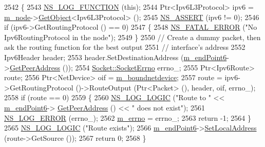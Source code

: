 \begin{DoxyCode}
2542 \{
2543   \hyperlink{log-macros-disabled_8h_a90b90d5bad1f39cb1b64923ea94c0761}{NS\_LOG\_FUNCTION} (\textcolor{keyword}{this});
2544   Ptr<Ipv6L3Protocol> ipv6 = \hyperlink{classns3_1_1TcpSocketBase_abefd2b9f439fe5d0deef93ee68884a1e}{m\_node}->\hyperlink{classns3_1_1Object_a13e18c00017096c8381eb651d5bd0783}{GetObject}<Ipv6L3Protocol> ();
2545   \hyperlink{assert_8h_a6dccdb0de9b252f60088ce281c49d052}{NS\_ASSERT} (ipv6 != 0);
2546   \textcolor{keywordflow}{if} (ipv6->GetRoutingProtocol () == 0)
2547     \{
2548       \hyperlink{group__fatal_ga5131d5e3f75d7d4cbfd706ac456fdc85}{NS\_FATAL\_ERROR} (\textcolor{stringliteral}{"No Ipv6RoutingProtocol in the node"});
2549     \}
2550   \textcolor{comment}{// Create a dummy packet, then ask the routing function for the best output}
2551   \textcolor{comment}{// interface's address}
2552   Ipv6Header header;
2553   header.SetDestinationAddress (\hyperlink{classns3_1_1TcpSocketBase_ab4b114c3959ee672b4fc9b7a90540dba}{m\_endPoint6}->\hyperlink{classns3_1_1Ipv6EndPoint_aa48c776ae54d85cf0f6a61a80d7b4cd8}{GetPeerAddress} ());
2554   \hyperlink{classns3_1_1Socket_ada1328c5ae0c28cb2a982caf8f6d6cca}{Socket::SocketErrno} errno\_;
2555   Ptr<Ipv6Route> route;
2556   Ptr<NetDevice> oif = \hyperlink{classns3_1_1Socket_a9781d8dfdb5e9364d5dce8f53b768bb5}{m\_boundnetdevice};
2557   route = ipv6->GetRoutingProtocol ()->RouteOutput (Ptr<Packet> (), header, oif, errno\_);
2558   \textcolor{keywordflow}{if} (route == 0)
2559     \{
2560       \hyperlink{group__logging_ga88acd260151caf2db9c0fc84997f45ce}{NS\_LOG\_LOGIC} (\textcolor{stringliteral}{"Route to "} << \hyperlink{classns3_1_1TcpSocketBase_ab4b114c3959ee672b4fc9b7a90540dba}{m\_endPoint6}->
      \hyperlink{classns3_1_1Ipv6EndPoint_aa48c776ae54d85cf0f6a61a80d7b4cd8}{GetPeerAddress} () << \textcolor{stringliteral}{" does not exist"});
2561       \hyperlink{group__logging_ga0261a8db1d4ac5f79417d117634fd455}{NS\_LOG\_ERROR} (errno\_);
2562       \hyperlink{classns3_1_1TcpSocketBase_a592901b6c992843533af1b7c1c7f9474}{m\_errno} = errno\_;
2563       \textcolor{keywordflow}{return} -1;
2564     \}
2565   \hyperlink{group__logging_ga88acd260151caf2db9c0fc84997f45ce}{NS\_LOG\_LOGIC} (\textcolor{stringliteral}{"Route exists"});
2566   \hyperlink{classns3_1_1TcpSocketBase_ab4b114c3959ee672b4fc9b7a90540dba}{m\_endPoint6}->\hyperlink{classns3_1_1Ipv6EndPoint_aa1dd94923ccc95928694197550d4561e}{SetLocalAddress} (route->GetSource ());
2567   \textcolor{keywordflow}{return} 0;
2568 \}
\end{DoxyCode}


